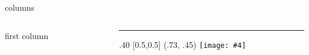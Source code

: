 \documentclass[aspectratio=43]{beamer}
\makeatletter
\newcommand{\absimage}[4][0.5,0.5]{%
	\begin{textblock}{#3}%
		[#1]%
		(#2)%
		\texttt{[image: \#4]}%
\end{textblock}}
\newcommand{\mininomen}[2][1]{{\let\thefootnote\relax%
	\footnotetext{\begin{tabular}{*{#1}{@{\!}>{\centering\arraybackslash}p{1em}@{\;}p{\textwidth/#1-2em}}}%
	#2\end{tabular}}}}
\makeatother
\begin{document}
	
	
	
	

\begin{frame}{columns}
  \begin{columns}[onlytextwidth]
    \begin{column}{.5\textwidth}
      first column
    \end{column}
    \begin{column}{.5\textwidth}
      \textcolor{tudCyan}{\rule{1\columnwidth}{1\columnwidth}}
      \absimage{.73, .45}{.40}{logo-ugr.pdf}
    \end{column}
  \end{columns}
\end{frame}
\end{document}
